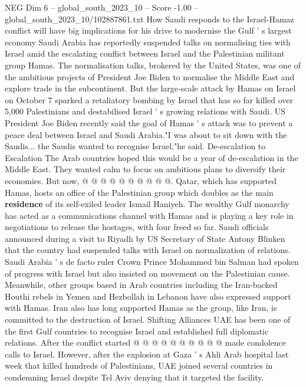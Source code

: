 \begin{textsample}{NEG Dim 6 – global\_south\_2023\_10 – Score -1.00 – global\_south\_2023\_10/102887861.txt}  \label{ex:f6_neg_214}
How Saudi responds to the Israel-Hamaz conflict will have big implications for his drive to modernise the Gulf ' s largest economy Saudi Arabia has reportedly suspended talks on normalising ties with Israel amid the escalating conflict between Israel and the Palestinian militant group Hamas.
The normalisation talks, brokered by the United States, was one of the ambitious projects of President Joe Biden to normalise the Middle East and explore trade in the subcontinent.
But the large-scale attack by Hamas on Israel on October 7 sparked a retaliatory bombing by Israel that has so far killed over 5,000 Palestinians and destabilised Israel ' s growing relations with Saudi.
US President Joe Biden recently said the goal of Hamas ' s attack was to prevent a peace deal between Israel and Saudi Arabia."I was about to sit down with the Saudis... the Saudis wanted to recognise Israel,"he said.
De-escalation to Escalation The Arab countries hoped this would be a year of de-escalation in the Middle East.
They wanted calm to focus on ambitious plans to diversify their economies.
But now, @ @ @ @ @ @ @ @ @ @.
Qatar, which has supported Hamas, hosts an office of the Palestinian group which doubles as the main \textbf{residence} of its self-exiled leader Ismail Haniyeh.
The wealthy Gulf monarchy has acted as a communications channel with Hamas and is playing a key role in negotiations to release the hostages, with four freed so far.
Saudi officials announced during a visit to Riyadh by US Secretary of State Antony Blinken that the country had suspended talks with Israel on normalization of relations.
Saudi Arabia ' s de facto ruler Crown Prince Mohammed bin Salman had spoken of progress with Israel but also insisted on movement on the Palestinian cause.
Meanwhile, other groups based in Arab countries including the Iran-backed Houthi rebels in Yemen and Hezbollah in Lebanon have also expressed support with Hamas.
Iran also has long supported Hamas as the group, like Iran, is committed to the destruction of Israel.
Shifting Alliances UAE has been one of the first Gulf countries to recognise Israel and established full diplomatic relations.
After the conflict started @ @ @ @ @ @ @ @ @ @ made condolence calls to Israel.
However, after the explosion at Gaza ' s Ahli Arab hospital last week that killed hundreds of Palestinians, UAE joined several countries in condemning Israel despite Tel Aviv denying that it targeted the facility.

\end{textsample}
